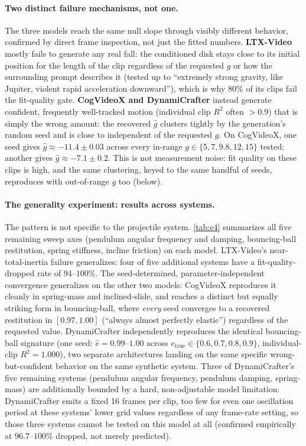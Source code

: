 \documentclass[10pt,twocolumn,letterpaper]{article}
\begin{document}
\paragraph{Two distinct failure mechanisms, not one.}
The three models reach the same null slope through visibly different
behavior, confirmed by direct frame inspection, not just the fitted numbers.
\textbf{LTX-Video} mostly fails to generate any real fall: the conditioned
disk stays close to its initial position for the length of the clip
regardless of the requested $g$ or how the surrounding prompt describes it
(tested up to ``extremely strong gravity, like Jupiter, violent rapid
acceleration downward''), which is why $80\%$ of its clips fail the
fit-quality gate. \textbf{CogVideoX and DynamiCrafter} instead generate
confident, frequently well-tracked motion (individual clip $R^2$ often
$>0.9$) that is simply the wrong amount: the recovered $\hat g$ clusters
tightly by the generation's random seed and is close to independent of the
requested $g$. On CogVideoX, one seed gives $\hat g \approx -11.4 \pm 0.03$
across every in-range $g\in\{5,7,9.8,12,15\}$ tested; another gives
$\hat g\approx -7.1\pm0.2$. This is not measurement noise: fit quality on
these clips is high, and the same clustering, keyed to the same handful of
seeds, reproduces with out-of-range $g$ too (below).

\paragraph{The generality experiment: results across systems.}
The pattern is not specific to the projectile system. \autoref{tab:e4}
summarizes all five remaining sweep axes (pendulum angular frequency and
damping, bouncing-ball restitution, spring stiffness, incline friction) on
each model. LTX-Video's near-total-inertia failure generalizes: four of five
additional systems have a fit-quality-dropped rate of $94$--$100\%$. The
seed-determined, parameter-independent convergence generalizes on the other
two models: CogVideoX reproduces it cleanly in spring-mass and inclined-slide,
and reaches a distinct but equally striking form in bouncing-ball, where
\emph{every} seed converges to a recovered restitution in $[0.97,1.00]$
(``always almost perfectly elastic'') regardless of the requested value.
DynamiCrafter independently reproduces the identical bouncing-ball signature
(one seed: $\hat e = 0.99$--$1.00$ across $e_\text{true}\in\{0.6,0.7,0.8,0.9\}$,
individual-clip $R^2=1.000$), two separate architectures landing on the
same specific wrong-but-confident behavior on the same synthetic system. Three
of DynamiCrafter's five remaining systems (pendulum angular frequency,
pendulum damping, spring-mass) are additionally bounded by a hard,
non-adjustable model limitation: DynamiCrafter emits a fixed 16 frames per
clip, too few for even one oscillation period at these systems' lower grid
values regardless of any frame-rate setting, so those three systems cannot
be tested on this model at
all (confirmed empirically at $96.7$--$100\%$ dropped, not merely predicted).
\end{document}
